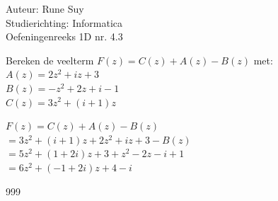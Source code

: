 \documentclass[a4paper]{article}
\begin{document}
  
\noindent \large Auteur: Rune Suy \\
\noindent \large Studierichting: Informatica\\
\noindent \large Oefeningenreeks 1D nr. 4.3\\

\medskip

\normalsize

Bereken de veelterm $F(z) = C(z) + A(z) - B(z)$ met:\\

$A(z) = 2z^2 + iz + 3 $\\

$B(z) = -z^2 + 2z + i - 1 $\\

$C(z) = 3z^2 + (i+1)z $\\

\medskip

$F(z) = C(z) + A(z) - B(z)$\\

$ = 3z^2 + (i + 1)z + 2z^2 + iz + 3 - B(z)$\\

$ = 5z^2 + (1 + 2i)z + 3 + z^2 - 2z - i + 1$\\	

$ = 6z^2 + (-1 + 2i)z + 4 - i$\\

\begin{thebibliography}{999}
\end{thebibliography}
\end{document}
